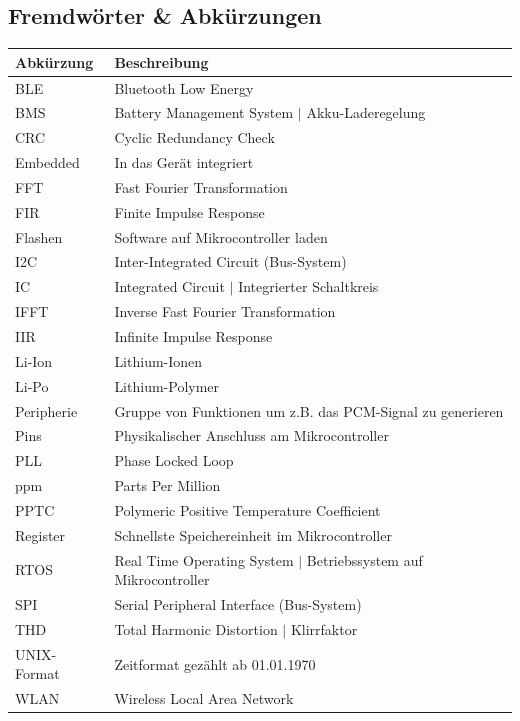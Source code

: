 \documentclass[12pt]{article}
\begin{document}
	\subsection{Fremdwörter \& Abkürzungen}
	\begin{table}[H]
		\centering
		\begin{tabular}{|l|p{}|}
			\hline
			\textbf{Abkürzung} & \textbf{Beschreibung} \\ \hline
			BLE & Bluetooth Low Energy \\ \hline
			BMS & Battery Management System $\vert$ Akku-Laderegelung \\ \hline
			CRC & Cyclic Redundancy Check \\ \hline
			Embedded & In das Gerät integriert \\ \hline
			FFT & Fast Fourier Transformation \\ \hline
			FIR & Finite Impulse Response \\ \hline
			Flashen & Software auf Mikrocontroller laden \\ \hline
			I2C & Inter-Integrated Circuit (Bus-System) \\ \hline
			IC & Integrated Circuit $\vert$ Integrierter Schaltkreis \\ \hline
			IFFT & Inverse Fast Fourier Transformation \\ \hline
			IIR & Infinite Impulse Response \\ \hline
			Li-Ion & Lithium-Ionen \\ \hline
			Li-Po & Lithium-Polymer \\ \hline
			Peripherie & Gruppe von Funktionen um z.B. das PCM-Signal zu generieren \\ \hline
			Pins & Physikalischer Anschluss am Mikrocontroller \\ \hline
			PLL & Phase Locked Loop \\ \hline
			ppm & Parts Per Million \\ \hline
			PPTC & Polymeric Positive Temperature Coefficient \\ \hline
			Register & Schnellste Speichereinheit im Mikrocontroller \\ \hline
			RTOS & Real Time Operating System $\vert$ Betriebssystem auf Mikro\-controller \\ \hline
			SPI & Serial Peripheral Interface (Bus-System) \\ \hline
			THD & Total Harmonic Distortion $\vert$ Klirrfaktor \\ \hline
			UNIX-Format & Zeitformat gezählt ab 01.01.1970 \\ \hline
			WLAN & Wireless Local Area Network \\ \hline
		\end{tabular}
	\end{table}
	
\end{document}

